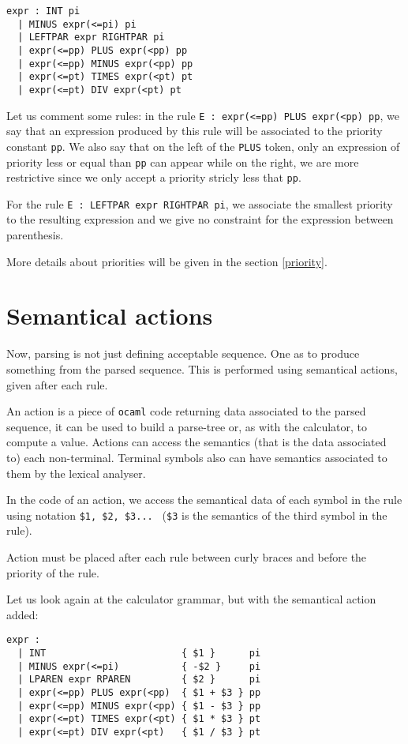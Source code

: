 \documentclass[12pt]{article}
\begin{document}
{\begin{verbatim}
expr : INT pi 
  | MINUS expr(<=pi) pi 
  | LEFTPAR expr RIGHTPAR pi
  | expr(<=pp) PLUS expr(<pp) pp
  | expr(<=pp) MINUS expr(<pp) pp
  | expr(<=pt) TIMES expr(<pt) pt
  | expr(<=pt) DIV expr(<pt) pt
\end{verbatim}
 
Let us comment some rules: in the rule  
\verb#E : expr(<=pp) PLUS expr(<pp) pp#, 
we say that an expression produced by this rule will be associated to
the priority constant \verb#pp#. We also say that on the left of the
\verb#PLUS#
token, only an expression of priority less or equal than \verb#pp# can
appear while on the right, we are more restrictive since we only
accept a priority stricly less that \verb#pp#.

For the rule \verb#E : LEFTPAR expr RIGHTPAR pi#, we associate the
smallest priority to the resulting expression and we give no
constraint
for the expression between parenthesis.

More details about priorities will be given in the section \ref{priority}.

\section{Semantical actions}\label{actions}

Now, parsing is not just defining acceptable sequence. One as to
produce something from the parsed sequence. This is performed using
semantical actions, given after each rule.

 An action is a piece of
\verb#ocaml# code returning data associated to the parsed sequence, it can
be used to build a parse-tree or, as with the calculator, to compute a value.
Actions can access the semantics (that is the data
associated to) each non-terminal. Terminal symbols also can have
semantics associated to them by the lexical analyser. 

In the code of
an action, we access the semantical data of each symbol in the rule
using notation \verb#$1, $2, $3... # (\verb#$3# is the semantics of 
the third symbol in the rule).

Action must be placed after each rule between curly braces and before
the priority of the rule.

Let us look again at the calculator grammar, but with the
semantical action added:

\begin{verbatim}
expr :
  | INT                        { $1 }      pi
  | MINUS expr(<=pi)           { -$2 }     pi
  | LPAREN expr RPAREN         { $2 }      pi
  | expr(<=pp) PLUS expr(<pp)  { $1 + $3 } pp
  | expr(<=pp) MINUS expr(<pp) { $1 - $3 } pp
  | expr(<=pt) TIMES expr(<pt) { $1 * $3 } pt
  | expr(<=pt) DIV expr(<pt)   { $1 / $3 } pt
\end{verbatim}

}
\end{document}
